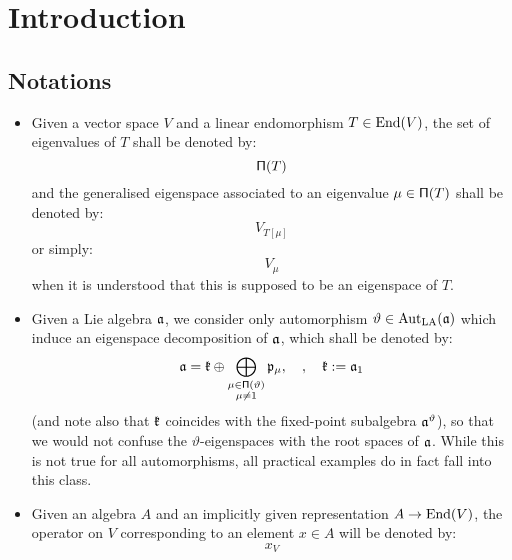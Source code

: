 \section{Introduction}
    \subsection{Notations}
        \begin{convention}[Endomorphisms] \label{conv: endomorphisms}
            \begin{itemize}
                \item Given a vector space $V$ and a linear endomorphism $T \in \operatorname{End}(V)$, the set of eigenvalues of $T$ shall be denoted by:
                    $$\mathsf{\Pi}(T)$$
                and the generalised eigenspace associated to an eigenvalue $\mu \in \mathsf{\Pi}(T)$ shall be denoted by:
                    $$V_{T[\mu]}$$
                or simply:
                    $$V_{\mu}$$
                when it is understood that this is supposed to be an eigenspace of $T$.
                \item Given a Lie algebra $\mathfrak{a}$, we consider only automorphism $\vartheta \in \operatorname{Aut}_{\mathrm{LA}}(\mathfrak{a})$ which induce an eigenspace decomposition of $\mathfrak{a}$, which shall be denoted by:
                    $$\mathfrak{a} = \mathfrak{k} \oplus \bigoplus_{ \substack{\mu \in \mathsf{\Pi}(\vartheta)\\\mu \not = 1} } \mathfrak{p}_{\mu}, \quad, \quad \mathfrak{k} := \mathfrak{a}_1$$
                (and note also that $\mathfrak{k}$ coincides with the fixed-point subalgebra $\mathfrak{a}^{\vartheta}$), so that we would not confuse the $\vartheta$-eigenspaces with the root spaces of $\mathfrak{a}$. While this is not true for all automorphisms, all practical examples do in fact fall into this class.
                \item Given an algebra $A$ and an implicitly given representation $A \to \operatorname{End}(V)$, the operator on $V$ corresponding to an element $x \in A$ will be denoted by:
                    $$x_V$$
            \end{itemize}
        \end{convention}


